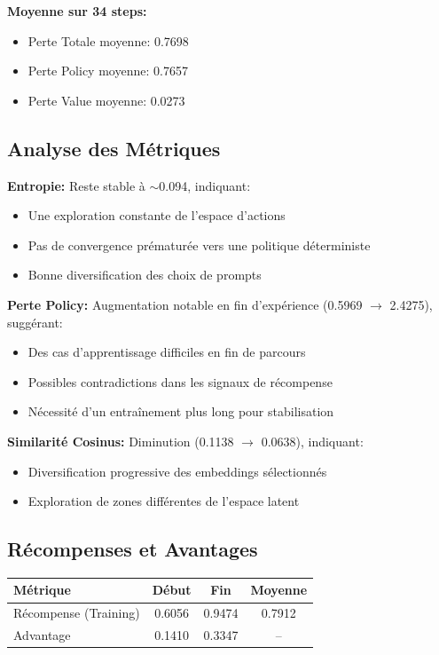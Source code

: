 \documentclass[12pt,a4paper]{article}
\begin{document}
\textbf{Moyenne sur 34 steps:}
\begin{itemize}
    \item Perte Totale moyenne: 0.7698
    \item Perte Policy moyenne: 0.7657
    \item Perte Value moyenne: 0.0273
\end{itemize}

\subsection{Analyse des Métriques}

\textbf{Entropie:} Reste stable à $\sim$0.094, indiquant:
\begin{itemize}
    \item Une exploration constante de l'espace d'actions
    \item Pas de convergence prématurée vers une politique déterministe
    \item Bonne diversification des choix de prompts
\end{itemize}

\textbf{Perte Policy:} Augmentation notable en fin d'expérience (0.5969 $\rightarrow$ 2.4275), suggérant:
\begin{itemize}
    \item Des cas d'apprentissage difficiles en fin de parcours
    \item Possibles contradictions dans les signaux de récompense
    \item Nécessité d'un entraînement plus long pour stabilisation
\end{itemize}

\textbf{Similarité Cosinus:} Diminution (0.1138 $\rightarrow$ 0.0638), indiquant:
\begin{itemize}
    \item Diversification progressive des embeddings sélectionnés
    \item Exploration de zones différentes de l'espace latent
\end{itemize}

\subsection{Récompenses et Avantages}

\begin{center}
\begin{tabular}{|l|c|c|c|}
\hline
\textbf{Métrique} & \textbf{Début} & \textbf{Fin} & \textbf{Moyenne} \\
\hline
Récompense (Training) & 0.6056 & 0.9474 & 0.7912 \\
Advantage & 0.1410 & 0.3347 & -- \\
\hline
\end{tabular}
\end{center}
\end{document}
